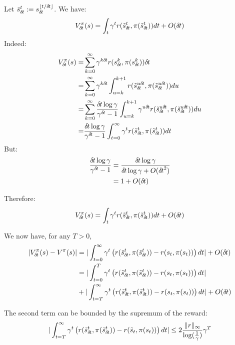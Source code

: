 
Let $\tilde s_{\delta\hspace{-.1em}t}^t \mathrel{\mathop{:}}= s_{\delta\hspace{-.1em}t}^{\lfloor t/{\delta\hspace{-.1em}t}\rfloor}$. We have:
\begin{align}
  V^\pi_{\delta\hspace{-.1em}t}(s) = \int_t \gamma^t r(\tilde s_{\delta\hspace{-.1em}t}^t, \pi(\tilde s_{\delta\hspace{-.1em}t}^t))dt + O({\delta\hspace{-.1em}t})
\end{align}
Indeed:
\begin{align}
  V^\pi_\deltat(s) =& \sum_{k=0}^\infty \gamma^{k\deltat}r(s_\deltat^k, \pi( s_\deltat^k))\deltat \\
  =& \sum_{k=0}^\infty \gamma^{k\deltat}\int_{u=k}^{k+1}r(\tilde s_\deltat^{u\deltat}, \pi( \tilde s_\deltat^{u\deltat}))du \\
  =& \sum_{k=0}^\infty \frac{\deltat \log \gamma}{\gamma^\deltat - 1}\int_{u=k}^{k+1}\gamma^{u\deltat}r(\tilde s_\deltat^{u\deltat}, \pi( \tilde s_\deltat^{u\deltat})) du \\
  =& \frac{\deltat \log \gamma}{\gamma^\deltat - 1}  \int_{t=0}^{\infty}\gamma^{t}r(\tilde s_\deltat^{t}, \pi( \tilde s_\deltat^{t}))dt \\
\end{align}
But:
\begin{align}
  \frac{{\delta\hspace{-.1em}t} \log \gamma}{\gamma^{\delta\hspace{-.1em}t} - 1} &= \frac{{\delta\hspace{-.1em}t} \log \gamma}{{\delta\hspace{-.1em}t} \log\gamma + O({\delta\hspace{-.1em}t}^2)} \\
  &= 1 +  O({\delta\hspace{-.1em}t}) \\
\end{align}

Therefore:
\begin{align}
  V^\pi_{\delta\hspace{-.1em}t}(s) = \int_t \gamma^t r(\tilde s_{\delta\hspace{-.1em}t}^t, \pi(\tilde s_{\delta\hspace{-.1em}t}^t))dt + O({\delta\hspace{-.1em}t})
\end{align}

We now have, for any $T>0$,
\begin{align}
  |V^\pi_{\delta\hspace{-.1em}t}(s) - V^\pi(s)|  &= | \int_{t=0}^\infty\gamma^t \left(r(\tilde s_{\delta\hspace{-.1em}t}^t, \pi(\tilde s_{\delta\hspace{-.1em}t}^t)) - r(s_t, \pi(s_t)) \right)dt | + O({\delta\hspace{-.1em}t}) \\
				 &= | \int_{t=0}^T\gamma^t \left(r(\tilde s_{\delta\hspace{-.1em}t}^t, \pi(\tilde s_{\delta\hspace{-.1em}t}^t)) - r(s_t, \pi(s_t)) \right)dt | \\
				 &+ | \int_{t=T}^\infty\gamma^t \left(r(\tilde s_{\delta\hspace{-.1em}t}^t, \pi(\tilde s_{\delta\hspace{-.1em}t}^t)) - r(s_t, \pi(s_t)) \right)dt | + O({\delta\hspace{-.1em}t})
\end{align}

The second term can be bounded by the supremum of the reward:
\begin{align}
  | \int_{t=T}^\infty\gamma^t \left(r(\tilde s_{\delta\hspace{-.1em}t}^t, \pi(\tilde s_{\delta\hspace{-.1em}t}^t)) - r(\tilde s_t, \pi(s_t)) \right)dt | \leq 2 \frac{\|r\|_\infty}{\log(\frac{1}{\gamma})} \gamma^T
  \label{eq:v-firstpart}
\end{align}


